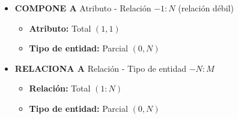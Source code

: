\begin{itemize}
\begin{itemize}
        \item \textbf{COMPONE A} Atributo - Relación $- 1:N$ (relación débil)
        \begin{itemize}
            \item \textbf{Atributo:} Total $(1,1)$
            \item \textbf{Tipo de entidad:} Parcial $(0,N)$
        \end{itemize}
                \item \textbf{RELACIONA A} Relación - Tipo de entidad $- N:M$
        \begin{itemize}
            \item \textbf{Relación:} Total $(1:N)$
            \item \textbf{Tipo de entidad:} Parcial $(0,N)$
        \end{itemize}

    \end{itemize}
\end{itemize}
